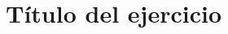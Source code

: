 \documentclass[11pt,a4paper,twoside,spanish,exercises]{teaching}
\begin{document}

\section{Título del ejercicio}
\end{document}
